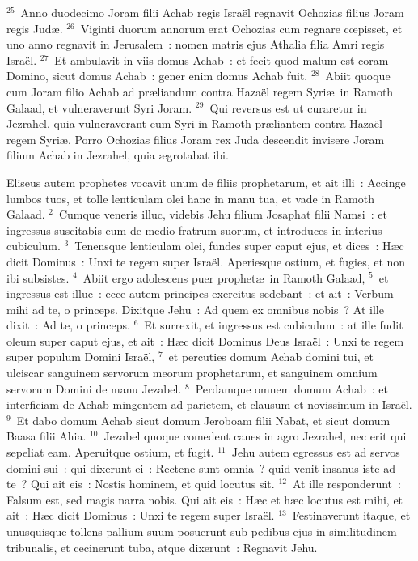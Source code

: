 ${}^{25}$~Anno duodecimo Joram filii Achab regis Isra\"el regnavit Ochozias filius Joram regis Jud\ae .
${}^{26}$~Viginti duorum annorum erat Ochozias cum regnare cœpisset, et uno anno regnavit in Jerusalem~: nomen matris ejus Athalia filia Amri regis Isra\"el.
${}^{27}$~Et ambulavit in viis domus Achab~: et fecit quod malum est coram Domino, sicut domus Achab~: gener enim domus Achab fuit.
${}^{28}$~Abiit quoque cum Joram filio Achab ad pr\ae liandum contra Haza\"el regem Syri\ae\ in Ramoth Galaad, et vulneraverunt Syri Joram.
${}^{29}$~Qui reversus est ut curaretur in Jezrahel, quia vulneraverant eum Syri in Ramoth pr\ae liantem contra Haza\"el regem Syri\ae . Porro Ochozias filius Joram rex Juda descendit invisere Joram filium Achab in Jezrahel, quia \ae grotabat ibi.

\lettrine[lines=10,image=true,loversize=0.05,lraise=-0.03]{E}{}liseus autem prophetes vocavit unum de filiis prophetarum, et ait illi~: Accinge lumbos tuos, et tolle lenticulam olei hanc in manu tua, et vade in Ramoth Galaad.
${}^{2}$~Cumque veneris illuc, videbis Jehu filium Josaphat filii Namsi~: et ingressus suscitabis eum de medio fratrum suorum, et introduces in interius cubiculum.
${}^{3}$~Tenensque lenticulam olei, fundes super caput ejus, et dices~: H\ae c dicit Dominus~: Unxi te regem super Isra\"el. Aperiesque ostium, et fugies, et non ibi subsistes.
${}^{4}$~Abiit ergo adolescens puer prophet\ae\ in Ramoth Galaad,
${}^{5}$~et ingressus est illuc~: ecce autem principes exercitus sedebant~: et ait~: Verbum mihi ad te, o princeps. Dixitque Jehu~: Ad quem ex omnibus nobis~? At ille dixit~: Ad te, o princeps.
${}^{6}$~Et surrexit, et ingressus est cubiculum~: at ille fudit oleum super caput ejus, et ait~: H\ae c dicit Dominus Deus Isra\"el~: Unxi te regem super populum Domini Isra\"el,
${}^{7}$~et percuties domum Achab domini tui, et ulciscar sanguinem servorum meorum prophetarum, et sanguinem omnium servorum Domini de manu Jezabel.
${}^{8}$~Perdamque omnem domum Achab~: et interficiam de Achab mingentem ad parietem, et clausum et novissimum in Isra\"el.
${}^{9}$~Et dabo domum Achab sicut domum Jeroboam filii Nabat, et sicut domum Baasa filii Ahia.
${}^{10}$~Jezabel quoque comedent canes in agro Jezrahel, nec erit qui sepeliat eam. Aperuitque ostium, et fugit.
${}^{11}$~Jehu autem egressus est ad servos domini sui~: qui dixerunt ei~: Rectene sunt omnia~? quid venit insanus iste ad te~? Qui ait eis~: Nostis hominem, et quid locutus sit.
${}^{12}$~At ille responderunt~: Falsum est, sed magis narra nobis. Qui ait eis~: H\ae c et h\ae c locutus est mihi, et ait~: H\ae c dicit Dominus~: Unxi te regem super Isra\"el.
${}^{13}$~Festinaverunt itaque, et unusquisque tollens pallium suum posuerunt sub pedibus ejus in similitudinem tribunalis, et cecinerunt tuba, atque dixerunt~: Regnavit Jehu.


